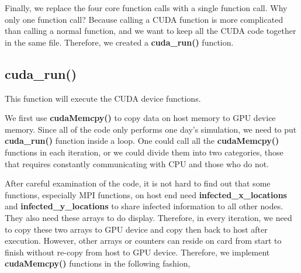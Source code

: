 \documentclass[letterpaper,10pt,openany,oneside]{sphinxmanual}
\begin{document}
Finally, we replace the four core function calls with a single function call. Why only one function call? Because calling a CUDA function is more complicated than calling a normal function, and we want to keep all the CUDA code together in the same file. Therefore, we created a \textbf{cuda\_run()} function.


\subsection{cuda\_run()}
\label{9-Cuda/cuda:cuda-run}
This function will execute the CUDA device functions.

We first use \textbf{cudaMemcpy()} to copy data on host memory to GPU device memory. Since all of the code only performs one day's simulation, we need to put \textbf{cuda\_run()} function inside a loop. One could call all the \textbf{cudaMemcpy()} functions in each iteration, or we could divide them into two categories, those that requires constantly communicating with CPU and those who do not.

After careful examination of the code, it is not hard to find out that some functions, especially MPI functions, on host end need \textbf{infected\_x\_locations} and \textbf{infected\_y\_locations} to share infected information to all other nodes. They also need these arrays to do display. Therefore, in every iteration, we need to copy these two arrays to GPU device and copy then back to host after execution. However, other arrays or counters can reside on card from start to finish without re-copy from host to GPU device. Therefore, we implement \textbf{cudaMemcpy()} functions in the following fashion,
\end{document}
